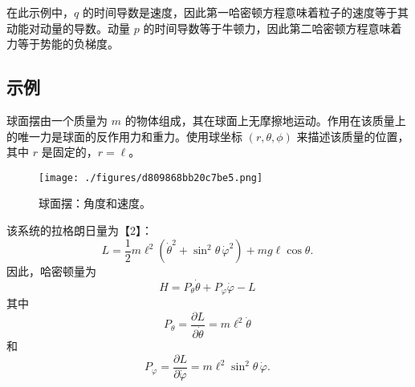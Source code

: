 在此示例中，\( q \) 的时间导数是速度，因此第一哈密顿方程意味着粒子的速度等于其动能对动量的导数。动量 \( p \) 的时间导数等于牛顿力，因此第二哈密顿方程意味着力等于势能的负梯度。
\subsection{示例}   
球面摆由一个质量为 \( m \) 的物体组成，其在球面上无摩擦地运动。作用在该质量上的唯一力是球面的反作用力和重力。使用球坐标 \( (r, \theta, \phi) \) 来描述该质量的位置，其中 \( r \) 是固定的，\( r = \ell \)。
\begin{figure}[ht]
\centering
\texttt{[image: ./figures/d809868bb20c7be5.png]}
\caption{球面摆：角度和速度。} \label{fig_HMD_2}
\end{figure}
该系统的拉格朗日量为【2】：
\[
L = \frac{1}{2}m\ell^2\left(\dot{\theta}^2 + \sin^2 \theta \, \dot{\varphi}^2\right) + mg\ell \cos \theta.~
\]
因此，哈密顿量为
\[
H = P_{\theta} \dot{\theta} + P_{\varphi} \dot{\varphi} - L~
\]
其中
\[
P_{\theta} = \frac{\partial L}{\partial \dot{\theta}} = m\ell^2 \dot{\theta}~
\]
和
\[
P_{\varphi} = \frac{\partial L}{\partial \dot{\varphi}} = m\ell^2 \sin^2 \theta \, \dot{\varphi}.~
\]